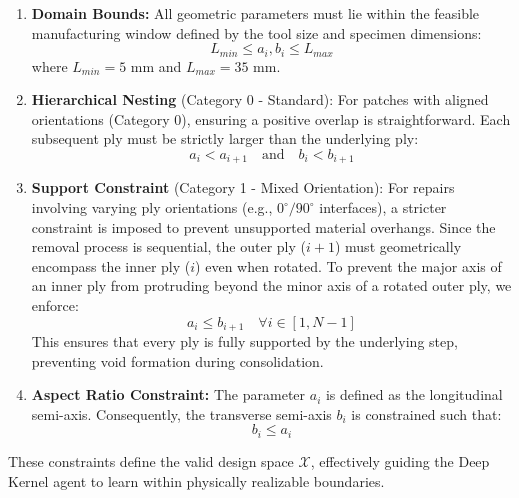 \documentclass[
  preprint,
  12pt,
  a4paper
]{elsarticle}
\begin{document}
\begin{enumerate}
    \item \textbf{Domain Bounds:} All geometric parameters must lie within the feasible manufacturing window defined by the tool size and specimen dimensions:
    \begin{equation}
        L_{min} \leq a_i, b_i \leq L_{max}
    \end{equation}
    where $L_{min}=5$ mm and $L_{max}=35$ mm.

    \item \textbf{Hierarchical Nesting} (Category 0 - Standard): For patches with aligned orientations (Category 0), ensuring a positive overlap is straightforward. Each subsequent ply must be strictly larger than the underlying ply:
    \begin{equation}
        a_i < a_{i+1} \quad \text{and} \quad b_i < b_{i+1}
    \end{equation}

    \item \textbf{Support Constraint} (Category 1 - Mixed Orientation): For repairs involving varying ply orientations (e.g., $0^\circ/90^\circ$ interfaces), a stricter constraint is imposed to prevent unsupported material overhangs. Since the removal process is sequential, the outer ply ($i+1$) must geometrically encompass the inner ply ($i$) even when rotated. To prevent the major axis of an inner ply from protruding beyond the minor axis of a rotated outer ply, we enforce:
    \begin{equation}
        a_i \leq b_{i+1} \quad \forall i \in [1, N-1]
    \end{equation}
    This ensures that every ply is fully supported by the underlying step, preventing void formation during consolidation.

    \item \textbf{Aspect Ratio Constraint:} The parameter $a_i$ is defined as the longitudinal semi-axis. Consequently, the transverse semi-axis $b_i$ is constrained such that:
    \begin{equation}
        b_i \leq a_i
    \end{equation}
\end{enumerate}

These constraints define the valid design space $\mathcal{X}$, effectively guiding the Deep Kernel agent to learn within physically realizable boundaries.
\end{document}
